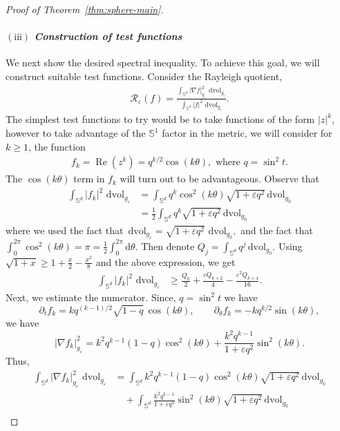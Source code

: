 \documentclass[11pt,reqno]{amsart}
\numberwithin{equation}{section}
\theoremstyle{definition}
\theoremstyle{remark}
\newcommand{\EQ}[1]{\begin{equation}\begin{split} #1 \end{split}\end{equation}}
\newcommand{\ud}{\mathrm{d}}
\newcommand{\0}{\emptyset}
\newcommand{\veps}{\varepsilon}
\newcommand{\bbS}{\mathbb S}
\newcommand{\calR}{\mathcal R}
\newcommand{\dvol}{\,\mathrm{dvol}}
\begin{document}
\begin{proof}[Proof of Theorem~\ref{thm:sphere-main}]
\paragraph{$\mathrm{(iii)}$ \textit{Construction of test functions}} We next show the desired spectral inequality. To achieve this goal, we will construct suitable test functions.  Consider the Rayleigh quotient,
\EQ{
\calR_\varepsilon(f)
    = \frac{\int_{\mathbb S^d}
        |\nabla f|_{g_\varepsilon}^2\,\dvol_{g_\varepsilon}}
        {\int_{\mathbb S^d}
        |f|^2\,\dvol_{g_\varepsilon}}.
}
The simplest test functions to try would be to take functions of the form $|z|^k$, however to take advantage of the $\bbS^1$ factor in the metric, we will consider for $k\geq 1$, the function
\begin{align}
     f_k=\operatorname{Re}(z^k) = q^{k/2}\cos(k\theta),
        \text{ where } q=\sin^2t.   
\end{align}
The $\cos(k\theta)$ term in $f_k$ will turn out to be advantageous. Observe that
\begin{align}\label{eqn:denom-lb}
\int_{\mathbb S^d} |f_k|^2\,\dvol_{g_\varepsilon} &= \int_{\bbS^d} q^{k} \cos^2(k\theta) \sqrt{1+\veps q^2} \dvol_{g_0}\\
&= \frac{1}{2}\int_{\bbS^d} q^{k}  \sqrt{1+\veps q^2} \dvol_{g_0}
\end{align}
where we used the fact that $\dvol_{g_\varepsilon}=\sqrt{1+\varepsilon q^2}\,\dvol_{g_0},$ and the fact that $\int_0^{2\pi} \cos^2(k\theta) =\pi=\frac{1}{2}\int_{0}^{2\pi}\ud\theta$. Then denote $Q_j=\int_{\mathbb{S}^d} q^j \dvol_{g_0}.$ Using $\sqrt{1+x}\geq 1+\frac{x}{2}-\frac{x^2}{8}$ and the above expression, we get 
\begin{align}
  \int_{\mathbb S^d} |f_k|^2\,\dvol_{g_\varepsilon} &\geq \frac{Q_k}{2} +\frac{\veps Q_{k+2}}{4}-\frac{\veps^2 Q_{k+4}}{16}.
\end{align}
Next, we estimate the numerator. Since, $q=\sin^2 t$ we have
\[
        \partial_t f_k
        =
        kq^{(k-1)/2}\sqrt{1-q}\,\cos(k\theta),
        \qquad
        \partial_\theta f_k
        =
        -kq^{k/2}\sin(k\theta),
\]
we have 
\[
|\nabla f_k|_{g_\varepsilon}^2
=
k^2q^{k-1}(1-q)\cos^2(k\theta)
+
\frac{k^2q^{k-1}}{1+\varepsilon q^2}\sin^2(k\theta).
\]
Thus,
\begin{align}\label{eqn:numerator-ub}
\int_{\mathbb S^d} |\nabla f_k|_{g_\veps}^2\,\dvol_{g_\varepsilon} &= \int_{\bbS^d} k^2 q^{k-1}(1-q)\cos^2(k\theta)\sqrt{1+\veps q^2} \dvol_{g_0}  \\
&\quad + \int_{\bbS^d}\frac{k^2 q^{k-1}}{1+\veps q^2} \sin^2 (k\theta) \sqrt{1+\veps q^2} \dvol_{g_0}\\

\end{align}
\end{proof}
\end{document}
